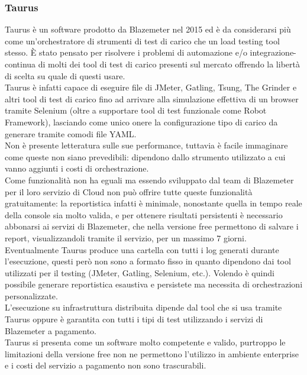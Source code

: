 \subsubsection{Taurus}
Taurus è un software prodotto da Blazemeter nel 2015 ed è da considerarsi più come un'orchestratore di strumenti di test di carico che un load testing tool stesso. È stato pensato per risolvere i problemi di automazione e/o \gls{integrazione-continua} di molti dei tool di test di carico presenti sul mercato offrendo la libertà di scelta su quale di questi usare.\\
Taurus è infatti capace di eseguire file di JMeter, Gatling, Tsung, The Grinder e altri tool di test di carico fino ad arrivare alla simulazione effettiva di un browser tramite Selenium (oltre a supportare tool di test funzionale come Robot Framework), lasciando come unico onere la configurazione tipo di carico da generare tramite comodi file YAML. \\
Non è presente letteratura sulle sue performance, tuttavia è facile immaginare come queste non siano prevedibili: dipendono dallo strumento utilizzato a cui vanno aggiunti i costi di orchestrazione. \\
Come funzionalità non ha eguali ma essendo sviluppato dal team di Blazemeter per il loro servizio di Cloud non può offrire tutte queste funzionalità gratuitamente: la reportistica infatti è minimale, nonostante quella in tempo reale della console sia molto valida, e per ottenere risultati persistenti è necessario abbonarsi ai servizi di Blazemeter, che nella versione free permettono di salvare i report, visualizzandoli tramite il servizio, per un massimo 7 giorni.
Eventualmente Taurus produce una cartella con tutti i log generati durante l’esecuzione, questi però non sono a formato fisso in quanto dipendono dai tool utilizzati per il testing (JMeter, Gatling, Selenium, etc.). Volendo è quindi possibile generare reportistica esaustiva e persistete ma necessita di orchestrazioni personalizzate. \\
L'esecuzione su infrastruttura distribuita dipende dal tool che si usa tramite Taurus oppure è garantita con tutti i tipi di test utilizzando i servizi di Blazemeter a pagamento. \\
Taurus si presenta come un software molto competente e valido, purtroppo le limitazioni della versione free non ne permettono l'utilizzo in ambiente enterprise e i costi del servizio a pagamento non sono trascurabili.
